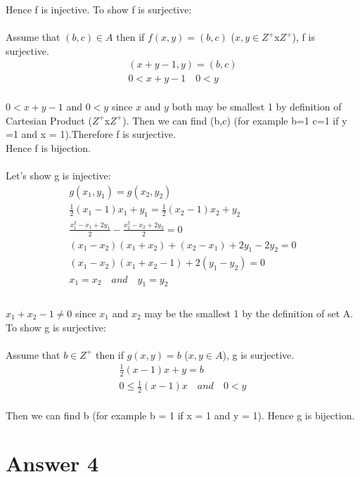 \documentclass[12pt]{article}
\begin{document}
Hence f is injective. To show f is surjective:\\ \\
Assume that $(b,c) \in A$  then if $f(x,y)=(b,c)$ ($ x,y \in Z^+$x$Z^+$), f is surjective.
\begin{equation} 
\label{eq3}
\begin{split}
    (x+y-1,y) = (b,c) \\
    0<x+y-1 \quad 0<y 
\end{split}
\end{equation} \\
$0<x+y-1$ and  $0<y$ since $x$ and $y$ both may be smallest 1 by definition of Cartesian Product ($Z^+$x$Z^+$). Then we can find (b,c) (for example b=1 c=1 if y =1 and x = 1).Therefore f is surjective.\\
Hence f is bijection.\\ \\
Let's show g is injective:
\begin{equation} 
\label{eq3}
\begin{split}
    g(x_1,y_1) = g(x_2,y_2) \\
    \frac{1}{2}(x_1-1)x_1 +y_1 = \frac{1}{2}(x_2-1)x_2 + y_2\\
    \frac{x_1^2-x_1+2y_1}{2}-\frac{x_2^2-x_2+2y_2}{2} = 0 \\
    (x_1-x_2)(x_1+x_2) +(x_2-x_1) +2y_1-2y_2 = 0 \\
    (x_1-x_2)(x_1+x_2-1) + 2 (y_1-y_2) = 0 \\
    x_1 = x_2 \quad and \quad y_1 =y_2 \\
\end{split}
\end{equation} \\
$ x_1+x_2-1 \neq 0 $ since $x_1$ and $x_2$ may be the smallest 1 by the definition of set A. To show g is surjective: \\ \\
Assume that $b \in Z^+$ then if $g(x,y)=b$ ($ x,y \in A$), g is surjective.
\begin{equation} 
\label{eq3}
\begin{split}
    \frac{1}{2}(x-1)x+y = b \\
    0 \leq\frac{1}{2}(x-1)x \quad and \quad 0<y
\end{split}
\end{equation} \\
Then we can find b (for example b = 1 if x = 1 and y = 1). Hence g is bijection.
\section*{Answer 4}
\end{document}
